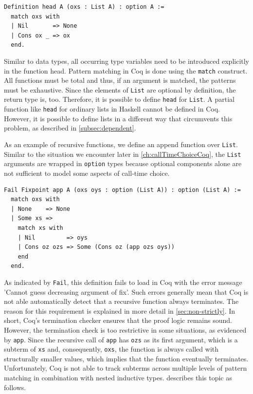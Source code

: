 \documentclass[a4paper, 11pt, fleqn, twoside]{scrreprt}
\newcommand{\cinl}[1]{\texttt{#1}}
\begin{document}
\begin{verbatim}
Definition head A (oxs : List A) : option A :=
  match oxs with
  | Nil       => None
  | Cons ox _ => ox
  end.
\end{verbatim}

Similar to data types, all occurring type variables need to be introduced explicitly in the function head.
Pattern matching in Coq is done using the \cinl{match} construct.
All functions must be total and thus, if an argument is matched, the patterns must be exhaustive.
Since the elements of \cinl{List} are optional by definition, the return type is, too.
Therefore, it is possible to define \cinl{head} for \cinl{List}.
A partial function like \cinl{head} for ordinary lists in Haskell cannot be defined in Coq.
However, it is possible to define lists in a different way that circumvents this problem, as described in \autoref{subsec:dependent}.

As an example of recursive functions, we define an append function over \cinl{List}.
Similar to the situation we encounter later in \autoref{ch:callTimeChoiceCoq}, the \cinl{List} arguments are wrapped in \cinl{option} types because optional components alone are not sufficient to model some aspects of call-time choice.

\begin{verbatim}
Fail Fixpoint app A (oxs oys : option (List A)) : option (List A) :=
  match oxs with
  | None    => None
  | Some xs =>
    match xs with
    | Nil         => oys
    | Cons oz ozs => Some (Cons oz (app ozs oys))
    end
  end.
\end{verbatim}

As indicated by \cinl{Fail}, this definition fails to load in Coq with the error message 'Cannot guess decreasing argument of fix'.
Such errors generally mean that Coq is not able automatically detect that a recursive function always terminates.
The reason for this requirement is explained in more detail in \autoref{sec:non-strictly}.
In short, Coq's termination checker ensures that the proof logic remains sound.
However, the termination check is too restrictive in some situations, as evidenced by \cinl{app}.
Since the recursive call of \cinl{app} has \cinl{ozs} as its first argument, which is a subterm of \cinl{xs} and, consequently, \cinl{oxs}, the function is always called with structurally smaller values, which implies that the function eventually terminates.
Unfortunately, Coq is not able to track subterms across multiple levels of pattern matching in combination with nested inductive types. \citet{chlipala2013certified} describes this topic as follows.
\end{document}
